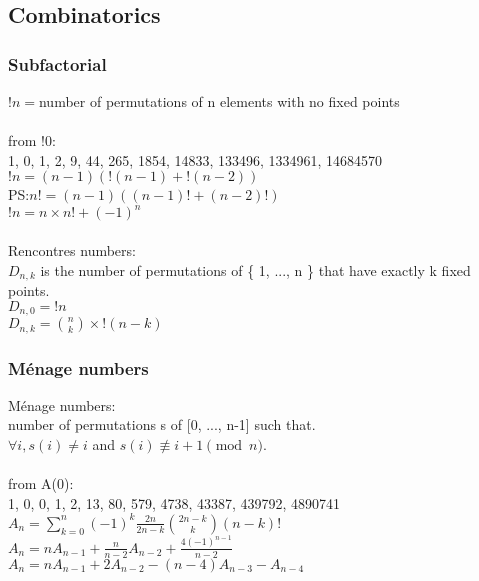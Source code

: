 \subsection{Combinatorics}

\subsubsection{Subfactorial}
$!n=$number of permutations of n elements with no fixed points\\
    \\
from !0:\\
1, 0, 1, 2, 9, 44, 265, 1854, 14833, 133496, 1334961, 14684570\\
$!n=(n-1)(!(n-1)+!(n-2))$\\
PS:$n!=(n-1)((n-1)!+(n-2)!)$\\
$!n=n\times n!+(-1)^n$\\
\\
Rencontres numbers:\\
$D_{n,k}$ is the number of permutations of \{ 1, ..., n \} that have exactly k fixed points.\\
$D_{n,0}=!n$\\
$D_{n,k}=\binom{n}{k}\times !(n-k)$\\

\subsubsection{M\'{e}nage numbers}
M\'{e}nage numbers:\\
number of permutations s of [0, ..., n-1] such that.\\
$ \forall i, s(i) \neq i$ and $s(i) \not\equiv i+1 \pmod n$.\\
\\
from A(0):\\
1, 0, 0, 1, 2, 13, 80, 579, 4738, 43387, 439792, 4890741\\

$A_n=\sum\limits_{k=0}^n (-1)^k \frac{2n}{2n-k} {2n-k\choose k} (n-k)!$\\
$A_n = n A_{n-1} + \frac{n}{n-2} A_{n-2} + \frac{4(-1)^{n-1}}{n-2}$\\
$A_n = n A_{n-1} + 2 A_{n-2} - (n-4)A_{n-3} - A_{n-4}$

